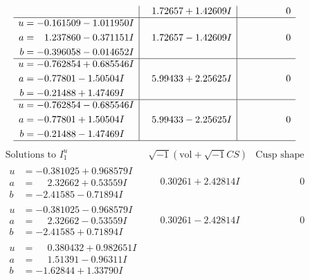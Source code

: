 \documentclass[1p]{elsarticle_modified}
\theoremstyle{definition}
\newcommand{\I}{\sqrt{-1}}
\begin{document}
$$\begin{array}{c|c|c}
 & \phantom{-}1.72657 + 1.42609 I & \phantom{-0.000000 } 0 \\ \hline\begin{aligned}
u &= -0.161509 - 1.011950 I \\
a &= \phantom{-}1.237860 - 0.371151 I \\
b &= -0.396058 - 0.014652 I\end{aligned}
 & \phantom{-}1.72657 - 1.42609 I & \phantom{-0.000000 } 0 \\ \hline\begin{aligned}
u &= -0.762854 + 0.685546 I \\
a &= -0.77801 - 1.50504 I \\
b &= -0.21488 + 1.47469 I\end{aligned}
 & \phantom{-}5.99433 + 2.25625 I & \phantom{-0.000000 } 0 \\ \hline\begin{aligned}
u &= -0.762854 - 0.685546 I \\
a &= -0.77801 + 1.50504 I \\
b &= -0.21488 - 1.47469 I\end{aligned}
 & \phantom{-}5.99433 - 2.25625 I & \phantom{-0.000000 } 0\\
 \hline 
 \end{array}$$\newpage$$\begin{array}{c|c|c}  
\text{Solutions to }I^u_{1}& \I (\text{vol} + \sqrt{-1}CS) & \text{Cusp shape}\\
 \hline 
\begin{aligned}
u &= -0.381025 + 0.968579 I \\
a &= \phantom{-}2.32662 + 0.53559 I \\
b &= -2.41585 - 0.71894 I\end{aligned}
 & \phantom{-}0.30261 + 2.42814 I & \phantom{-0.000000 } 0 \\ \hline\begin{aligned}
u &= -0.381025 - 0.968579 I \\
a &= \phantom{-}2.32662 - 0.53559 I \\
b &= -2.41585 + 0.71894 I\end{aligned}
 & \phantom{-}0.30261 - 2.42814 I & \phantom{-0.000000 } 0 \\ \hline\begin{aligned}
u &= \phantom{-}0.380432 + 0.982651 I \\
a &= \phantom{-}1.51391 - 0.96311 I \\
b &= -1.62844 + 1.33790 I\end{aligned}

\end{array}$$
\end{document}
